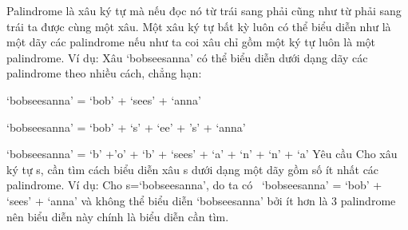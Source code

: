 Palindrome là xâu ký tự mà nếu đọc nó từ trái sang phải cũng như từ phải sang trái ta được cùng một xâu. Một xâu ký tự bất kỳ luôn có thể biểu diễn như là một dãy các palindrome nếu như ta coi xâu chỉ gồm một ký tự luôn là một palindrome. Ví dụ: Xâu ‘bobseesanna’ có thể biểu diễn dưới dạng dãy các palindrome theo nhiều cách, chẳng hạn:  

   ‘bobseesanna’ = ‘bob’ + ‘sees’ + ‘anna’  

   ‘bobseesanna’ = ‘bob’ + ‘s’ + ‘ee’ + ’s’ + ‘anna’  

   ‘bobseesanna’ = ‘b’ +’o’ + ‘b’ + ‘sees’ + ‘a’ + ‘n’ + ‘n’ + ‘a’
Yêu cầu
Cho xâu ký tự s, cần tìm cách biểu diễn xâu s dưới dạng một dãy gồm số ít nhất các palindrome. Ví dụ: Cho s=‘bobseesanna’, do ta có  ‘bobseesanna’ = ‘bob’ + ‘sees’ + ‘anna’ và không thể biểu diễn ‘bobseesanna’ bởi ít hơn là 3 palindrome nên biểu diễn này chính là biểu diễn cần tìm.